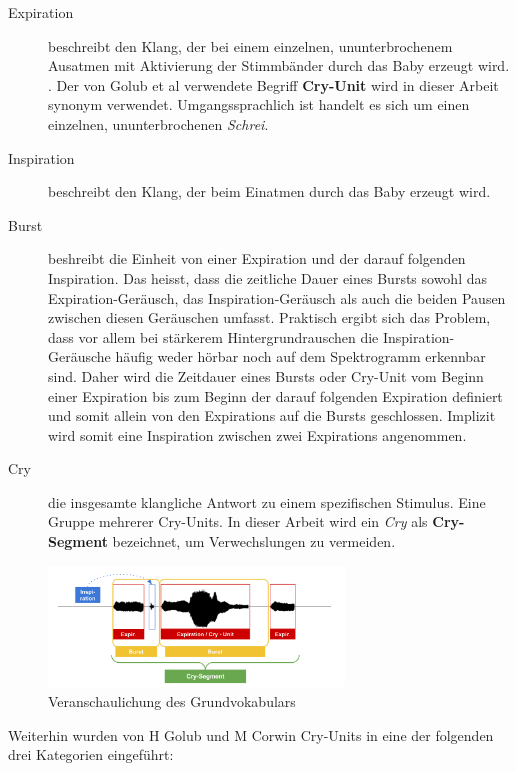 \begin{description}
	\item[Expiration] beschreibt den Klang, der bei einem einzelnen, ununterbrochenem Ausatmen mit Aktivierung der Stimmbänder durch das Baby erzeugt wird. \cite{rythmic}. Der von Golub et al \cite{cryModel} verwendete Begriff \textbf{Cry-Unit} wird in dieser Arbeit synonym verwendet. Umgangssprachlich ist handelt es sich um einen einzelnen, ununterbrochenen \emph{Schrei}.
	\item[Inspiration] beschreibt den Klang, der beim Einatmen durch das Baby erzeugt wird.
	\item[Burst] beshreibt die Einheit von einer Expiration und der darauf folgenden Inspiration. Das heisst, dass die zeitliche Dauer eines Bursts sowohl das Expiration-Geräusch, das Inspiration-Geräusch als auch die beiden Pausen zwischen diesen Geräuschen umfasst. Praktisch ergibt sich das Problem, dass vor allem bei stärkerem Hintergrundrauschen die Inspiration-Geräusche häufig weder hörbar noch auf dem Spektrogramm erkennbar sind. Daher wird die Zeitdauer eines Bursts oder Cry-Unit vom Beginn einer Expiration bis zum Beginn der darauf folgenden Expiration definiert und somit allein von den Expirations auf die Bursts geschlossen. Implizit wird somit eine Inspiration zwischen zwei Expirations angenommen.
	\item[Cry] die insgesamte klangliche Antwort zu einem spezifischen Stimulus. Eine Gruppe mehrerer Cry-Units.\cite{cryModel} In dieser Arbeit wird ein \emph{Cry} als \textbf{Cry-Segment} bezeichnet, um Verwechslungen zu vermeiden.
\end{description}

\begin{figure}
	\centering
	\includegraphics[width=0.7\textwidth]{bilder/cryVoc02.png}
	\caption{Veranschaulichung des Grundvokabulars}
	\label{img:cryVocabulary}
\end{figure}

Weiterhin wurden von H Golub und M Corwin \cite{cryModel} Cry-Units in eine der folgenden drei Kategorien eingeführt:

